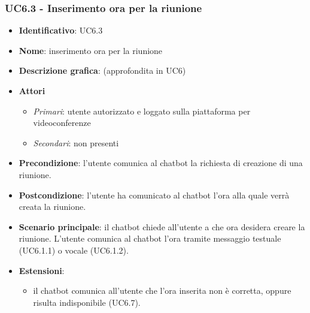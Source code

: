 \subsubsection{UC6.3 - Inserimento ora per la riunione}
\begin{itemize}
    \item \textbf{Identificativo}: UC6.3
    \item \textbf{Nome}: inserimento ora per la riunione
    \item \textbf{Descrizione grafica}: (approfondita in UC6)
    \item \textbf{Attori}
 \begin{itemize} 
    \item \textit{Primari}: utente autorizzato e loggato sulla piattaforma per videoconferenze
    \item \textit{Secondari}: non presenti
 \end{itemize}
 \item \textbf{Precondizione}: l'utente comunica al chatbot la richiesta di creazione di una riunione.
 \item \textbf{Postcondizione}: l'utente ha comunicato al chatbot l'ora alla quale verrà creata la riunione.
 \item \textbf{Scenario principale}: il chatbot chiede all'utente a che ora desidera creare la riunione. L'utente comunica al chatbot l'ora tramite messaggio testuale (UC6.1.1) o vocale (UC6.1.2).
 \item \textbf{Estensioni}: 
 \begin{itemize} 
    \item il chatbot comunica all'utente che l'ora inserita non è corretta, oppure risulta indisponibile (UC6.7).
 \end{itemize}
\end{itemize}

